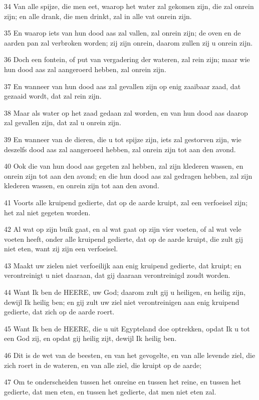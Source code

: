 \par 34 Van alle spijze, die men eet, waarop het water zal gekomen zijn, die zal onrein zijn; en alle drank, die men drinkt, zal in alle vat onrein zijn.
\par 35 En waarop iets van hun dood aas zal vallen, zal onrein zijn; de oven en de aarden pan zal verbroken worden; zij zijn onrein, daarom zullen zij u onrein zijn.
\par 36 Doch een fontein, of put van vergadering der wateren, zal rein zijn; maar wie hun dood aas zal aangeroerd hebben, zal onrein zijn.
\par 37 En wanneer van hun dood aas zal gevallen zijn op enig zaaibaar zaad, dat gezaaid wordt, dat zal rein zijn.
\par 38 Maar als water op het zaad gedaan zal worden, en van hun dood aas daarop zal gevallen zijn, dat zal u onrein zijn.
\par 39 En wanneer van de dieren, die u tot spijze zijn, iets zal gestorven zijn, wie deszelfs dood aas zal aangeroerd hebben, zal onrein zijn tot aan den avond.
\par 40 Ook die van hun dood aas gegeten zal hebben, zal zijn klederen wassen, en onrein zijn tot aan den avond; en die hun dood aas zal gedragen hebben, zal zijn klederen wassen, en onrein zijn tot aan den avond.
\par 41 Voorts alle kruipend gedierte, dat op de aarde kruipt, zal een verfoeisel zijn; het zal niet gegeten worden.
\par 42 Al wat op zijn buik gaat, en al wat gaat op zijn vier voeten, of al wat vele voeten heeft, onder alle kruipend gedierte, dat op de aarde kruipt, die zult gij niet eten, want zij zijn een verfoeisel.
\par 43 Maakt uw zielen niet verfoeilijk aan enig kruipend gedierte, dat kruipt; en verontreinigt u niet daaraan, dat gij daaraan verontreinigd zoudt worden.
\par 44 Want Ik ben de HEERE, uw God; daarom zult gij u heiligen, en heilig zijn, dewijl Ik heilig ben; en gij zult uw ziel niet verontreinigen aan enig kruipend gedierte, dat zich op de aarde roert.
\par 45 Want Ik ben de HEERE, die u uit Egypteland doe optrekken, opdat Ik u tot een God zij, en opdat gij heilig zijt, dewijl Ik heilig ben.
\par 46 Dit is de wet van de beesten, en van het gevogelte, en van alle levende ziel, die zich roert in de wateren, en van alle ziel, die kruipt op de aarde;
\par 47 Om te onderscheiden tussen het onreine en tussen het reine, en tussen het gedierte, dat men eten, en tussen het gedierte, dat men niet eten zal.


